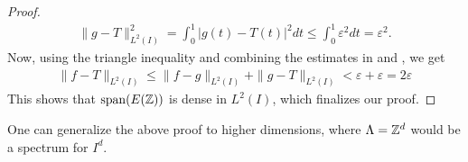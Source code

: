 \documentclass[../thesis.tex]{subfiles}
\begin{document}
\begin{proof}
\begin{align}
        \| g-T \|_{L^2(I)}^2 = \int_0^1 \left|g(t)-T(t) \right|^2dt \leq \int_0^1 \varepsilon^2 dt = \varepsilon^2.
    \end{align}
    Now, using the triangle inequality and combining the estimates in  and , we get
    \begin{align*}
        \| f-T\|_{L^2(I)} \leq  \| f-g\|_{L^2(I)} +\| g-T\|_{L^2(I)} < \varepsilon + \varepsilon =  2 \varepsilon
    \end{align*}
    This shows that $\operatorname{span}(E(\mathbb{Z}))$ is dense in $L^2(I)$, which finalizes our proof.
\end{proof}
One can generalize the above proof to higher dimensions, where $\Lambda = \mathbb{Z}^d$ would be a spectrum for $I^d$. %
\end{document}

